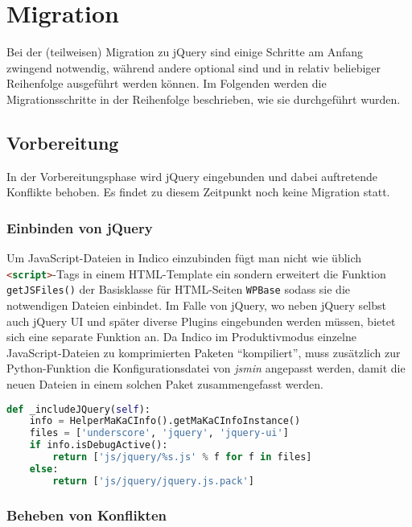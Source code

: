 \chapter{Migration}

Bei der (teilweisen) Migration zu jQuery sind einige Schritte am Anfang zwingend notwendig, während
andere optional sind und in relativ beliebiger Reihenfolge ausgeführt werden können. Im Folgenden
werden die Migrationsschritte in der Reihenfolge beschrieben, wie sie durchgeführt wurden.

\section{Vorbereitung}

In der Vorbereitungsphase wird jQuery eingebunden und dabei auftretende Konflikte behoben. Es findet
zu diesem Zeitpunkt noch keine Migration statt.

\subsection{Einbinden von jQuery}

Um JavaScript-Dateien in Indico einzubinden fügt man nicht wie üblich
\lstinline[language=HTML]{<script>}-Tags in einem HTML-Template ein sondern erweitert die Funktion
\lstinline{getJSFiles()} der Basisklasse für HTML-Seiten \lstinline{WPBase} sodass sie die
notwendigen Dateien einbindet. Im Falle von jQuery, wo neben jQuery selbst auch jQuery UI und später
diverse Plugins eingebunden werden müssen, bietet sich eine separate Funktion an. Da Indico im
Produktivmodus einzelne JavaScript-Dateien zu komprimierten Paketen \enquote{kompiliert}, muss
zusätzlich zur Python-Funktion die Konfigurationsdatei von \emph{jsmin} angepasst werden, damit die
neuen Dateien in einem solchen Paket zusammengefasst werden.

\begin{lstlisting}[language=Python,caption=Einbinden von jQuery und Underscore.js in Indico]
def _includeJQuery(self):
    info = HelperMaKaCInfo().getMaKaCInfoInstance()
    files = ['underscore', 'jquery', 'jquery-ui']
    if info.isDebugActive():
        return ['js/jquery/%s.js' % f for f in files]
    else:
        return ['js/jquery/jquery.js.pack']
\end{lstlisting}

\subsection{Beheben von Konflikten}

